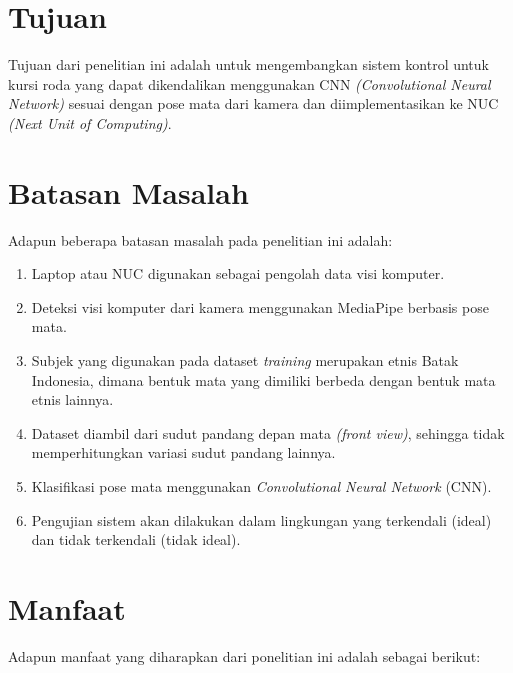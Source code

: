 \section{Tujuan}
\label{sec:Tujuan}

Tujuan dari penelitian ini adalah untuk mengembangkan sistem kontrol untuk kursi roda yang dapat dikendalikan menggunakan CNN \emph{(Convolutional Neural Network)} sesuai dengan pose mata dari kamera dan diimplementasikan ke NUC \textit{(Next Unit of Computing)}.

\section{Batasan Masalah}
\label{sec:batasanmasalah}

Adapun beberapa batasan masalah pada penelitian ini adalah:

\begin{enumerate}[nolistsep]

  \item Laptop atau NUC digunakan sebagai pengolah data visi komputer.
  
  \item Deteksi visi komputer dari kamera menggunakan MediaPipe berbasis pose mata.

  \item Subjek yang digunakan pada dataset \emph{training} merupakan etnis Batak Indonesia, dimana bentuk mata yang dimiliki berbeda dengan bentuk mata etnis lainnya.
  
  \item Dataset diambil dari sudut pandang depan mata \emph{(front view)}, sehingga tidak memperhitungkan variasi sudut pandang lainnya.

  \item Klasifikasi pose mata menggunakan \emph{Convolutional Neural Network} (CNN).

  \item Pengujian sistem akan dilakukan dalam lingkungan yang terkendali (ideal) dan tidak terkendali (tidak ideal).

\end{enumerate}

\section{Manfaat}


Adapun manfaat yang diharapkan dari ponelitian ini adalah sebagai berikut:

